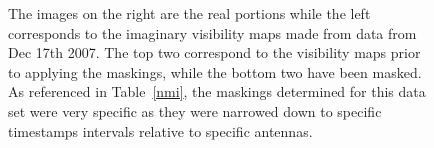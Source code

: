 \documentclass[a4paper,12pt]{article}
\begin{document}
\begin{figure}
                                                                                                                                                                                                                                                                                                                                                                                                                                                                                                                                                                                                                                                                                                                                                                                                                                                                                                                                                                            \caption{The images on the right are the real portions while the left corresponds to the imaginary visibility maps made from data from Dec 17th 2007. The top two correspond to the visibility maps prior to applying the maskings, while the bottom two have been masked. As referenced in Table~\ref{nmi}, the maskings determined for this data set were very specific as they were narrowed down to specific timestamps intervals relative to specific antennas.}

\end{figure}
\end{document}
